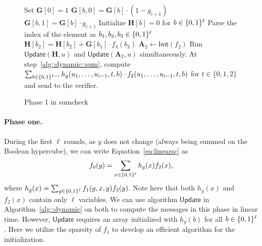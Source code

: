 \begin{figure}[b!]
\vspace{-.5in}
	\begin{algorithm}[H]
		\caption{Phase 1 in sumcheck}\label{alg::phase1}
		\begin{algorithmic}[1]
			\State Set $\textbf{G}[0] = 1$
			\State $\textbf{G}[b,0] = \textbf{G}[b]\cdot(1-g_{i+1})$
			\State $\textbf{G}[b,1] = \textbf{G}[b]\cdot g_{i+1}$
			\EndFor
			\EndFor
			\EndProcedure
			\State Initialize $\textbf{H}[b] = 0$ for $b\in\{0,1\}^\ell$
			\State Parse the index of the element as $b_1,b_2,b_3\in\{0,1\}^\ell$
			\State\label{alg::phase1::init} $\textbf{H}[b_2] = \textbf{H}[b_2]+ \textbf{G}[b_1]\cdot f_3(b_3)$
			\EndFor
			\EndProcedure
			\State $\textbf{A}_2\leftarrow\mathsf{Init}(f_2)$
			\State Run $\mathsf{Update}(\textbf{H},u)$ and $\mathsf{Update}(\textbf{A}_2,u)$ simultaneously. At step~\ref{alg::dynamic::sum}, compute $\sum_{b\in\{0,1\}^{\ell-i}}h_g(u_1,\ldots, u_{i-1}, t, b)\cdot f_2(u_1,\ldots, u_{i-1}, t, b)$ for $t\in\{0,1,2\}$ and send to the verifier.
			\EndProcedure
		\end{algorithmic}
	\end{algorithm}
	\vspace{-.5in}
\end{figure}



\paragraph{Phase one.} 
During the first $\ell$ rounds, as $y$ does not change (always being summed on the Boolean hypercube), we can write Equation~\ref{eq:linearsc} as 
\[
f_0(g) = \sum_{x\in\{0,1\}^\ell} h_g(x)f_2(x),
\]
where $h_g(x) = \sum_{y\in\{0,1\}^\ell}f_1(g,x,y)f_3(y)$. Note here that both $h_g(x)$ and $f_2(x)$ contain only $\ell$ variables. We can use algorithm $\mathsf{Update}$ in Algorithm~\ref{alg::dynamic} on both to compute the messages in this phase in linear time. However, $\mathsf{Update}$ requires an array initialized with $h_g(b)$ for all $b\in\{0,1\}^\ell$. Here we utilize the sparsity of $f_1$ to develop an efficient algorithm for the initialization.

